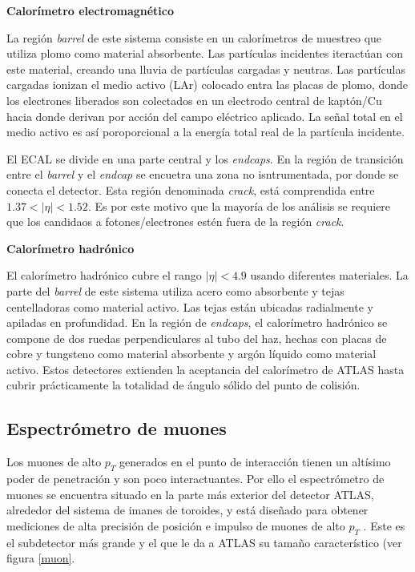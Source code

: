 {\bf Calorímetro electromagnético }

La región \textit{barrel} de este sistema consiste en un calorímetros de muestreo que utiliza plomo como material absorbente. Las partículas incidentes iteractúan con este material, creando una lluvia de partículas cargadas y neutras. Las partículas cargadas ionizan el medio activo (LAr) colocado entra las placas de plomo, donde los electrones liberados son colectados en un electrodo central de kaptón/Cu hacia donde derivan por acción del campo eléctrico aplicado. La señal total en el medio activo es así poroporcional a la energía total real de la partícula incidente.


El ECAL se divide en una parte central y los \textit{endcaps}. En la región de transición entre el \textit{barrel} y el \textit{endcap} se encuetra una zona no isntrumentada, por donde se conecta el detector. Esta región denominada \textit{crack}, está comprendida entre $1.37 < |\eta| < 1.52$. Es por este motivo que la mayoría de los análisis se requiere que los candidaos a fotones/electrones estén fuera de la región \textit{crack}.

{\bf Calorímetro hadrónico }

El calorímetro hadrónico cubre el rango $|\eta|< 4.9$ usando diferentes materiales. La parte del \textit{barrel} de este sistema utiliza acero como absorbente y tejas centelladoras como material activo. Las tejas están ubicadas radialmente y apiladas en profundidad. En la región de \textit{endcaps}, el calorímetro hadrónico se compone de dos ruedas perpendiculares al tubo del haz, hechas con placas de cobre y tungsteno como material absorbente y argón líquido como material activo. Estos detectores extienden la aceptancia del calorímetro de ATLAS hasta cubrir prácticamente la totalidad de ángulo sólido del punto de colisión.

\subsection{Espectrómetro de muones}

Los muones de alto $p_{T}$ generados en el punto de interacción tienen un altísimo poder de penetración y son poco interactuantes. Por ello el espectrómetro de muones se encuentra situado en la parte más exterior del detector ATLAS, alrededor del sistema de imanes de toroides, y está diseñado para obtener mediciones de alta precisión de posición e impulso de muones de alto $p_{T}$ . Este es el subdetector más grande y el que le da a ATLAS su tamaño característico (ver figura \ref{muon}. 

